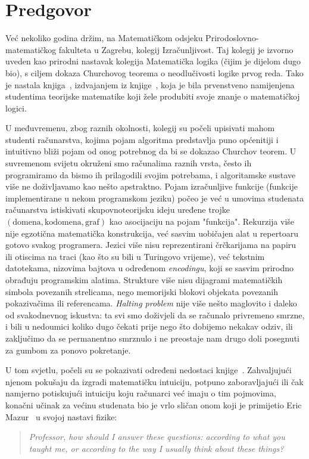 \chapter{Predgovor}


Već nekoliko godina držim, na Matematičkom odsjeku Prirodoslovno-matematičkog fakulteta u Zagrebu, kolegij Izračunljivost. Taj kolegij je izvorno uveden kao prirodni nastavak kolegija Matematička logika (čijim je dijelom dugo bio), s ciljem dokaza Churchovog teorema o neodlučivosti logike prvog reda. Tako je nastala knjiga~\cite{skr:Vuk}, izdvajanjem iz knjige~\cite{skr:VukML}, koja je bila prvenstveno namijenjena studentima teorijske matematike koji žele produbiti svoje znanje o matematičkoj logici.

U međuvremenu, zbog raznih okolnosti, kolegij su počeli upisivati mahom studenti računarstva, kojima pojam algoritma predstavlja puno općenitiji i intuitivno bliži pojam od onog potrebnog da bi se dokazao Churchov teorem. U suvremenom svijetu okruženi smo računalima raznih vrsta, često ih programiramo da bismo ih prilagodili svojim potrebama, i algoritamske sustave više ne doživljavamo kao nešto apstraktno. Pojam izračunljive funkcije (funkcije implementirane u nekom programskom jeziku) počeo je već u umovima studenata računarstva istiskivati skupovnoteorijsku ideju uređene trojke $(\text{domena},\text{kodomena},\text{graf})$ kao asocijaciju na pojam "funkcija". Rekurzija više nije egzotična matematička konstrukcija, već sasvim uobičajen alat u repertoaru gotovo svakog programera. Jezici više nisu reprezentirani črčkarijama na papiru ili otiscima na traci (kao što su bili u Turingovo vrijeme), već tekstnim datotekama, nizovima bajtova u određenom \emph{encodingu}, koji se sasvim prirodno obrađuju programskim alatima. Strukture više nisu dijagrami matematičkih simbola povezanih strelicama, nego memorijski blokovi objekata povezanih pokazivačima ili referencama. \emph{Halting problem} nije više nešto maglovito i daleko od svakodnevnog iskustva: ta svi smo doživjeli da se računalo privremeno smrzne, i bili u nedoumici koliko dugo čekati prije nego što dobijemo nekakav odziv, ili zaključimo da se permanentno smrznulo i ne preostaje nam drugo doli posegnuti za gumbom za ponovo pokretanje. 

U tom svjetlu, počeli su se pokazivati određeni nedostaci knjige~\cite{skr:Vuk}. Zahvaljujući njenom pokušaju da izgradi matematičku intuiciju, potpuno zaboravljajući ili čak namjerno potiskujući intuiciju koju računarci već imaju o tim pojmovima, konačni učinak za većinu studenata bio je vrlo sličan onom koji je primijetio Eric Mazur~\cite{mazur} u svojoj nastavi fizike:
\begin{quote}
    \emph{Professor, how should I answer these questions: according to what you taught me, or according to the way I usually think about these things?}
\end{quote}

